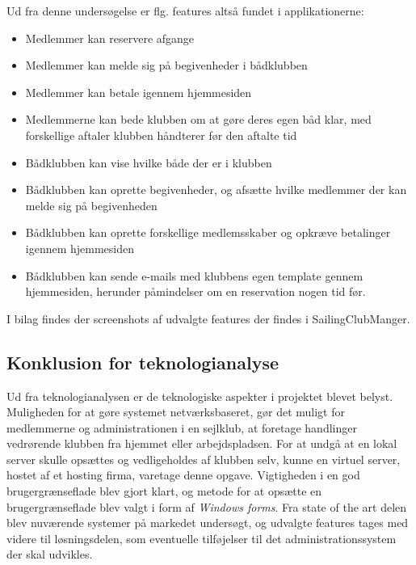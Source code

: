 Ud fra denne undersøgelse er flg. features altså fundet i applikationerne:

\begin{itemize}
  \item Medlemmer kan reservere afgange
  \item Medlemmer kan melde sig på begivenheder i bådklubben
  \item Medlemmer kan betale igennem hjemmesiden
  \item Medlemmerne kan bede klubben om at gøre deres egen båd klar, med forskellige aftaler klubben håndterer
        før den aftalte tid
  \item Bådklubben kan vise hvilke både der er i klubben
  \item Bådklubben kan oprette begivenheder, og afsætte hvilke medlemmer der kan melde sig på begivenheden
  \item Bådklubben kan oprette forskellige medlemsskaber og opkræve betalinger igennem hjemmesiden
  \item Bådklubben kan sende e-mails med klubbens egen template gennem hjemmesiden, herunder påmindelser om en
        reservation nogen tid før.
\end{itemize}

I bilag  findes der screenshots af udvalgte features der findes i SailingClubManger.


\subsection{Konklusion for teknologianalyse}

Ud fra teknologianalysen er de teknologiske aspekter i projektet blevet belyst. Muligheden for at gøre
systemet netværksbaseret, gør det muligt for medlemmerne og administrationen i en sejlklub, at foretage
handlinger vedrørende klubben fra hjemmet eller arbejdspladsen. For at undgå at en lokal server skulle
opsættes og vedligeholdes af klubben selv, kunne en virtuel server, hostet af et hosting firma, varetage denne
opgave. Vigtigheden i en god brugergrænseflade blev gjort klart, og metode for at opsætte en brugergrænseflade
blev valgt i form af \textit{Windows forms}. Fra state of the art delen blev nuværende systemer på markedet
undersøgt, og udvalgte features tages med videre til løsningsdelen, som eventuelle tilføjelser til det
administrationssystem der skal udvikles.


